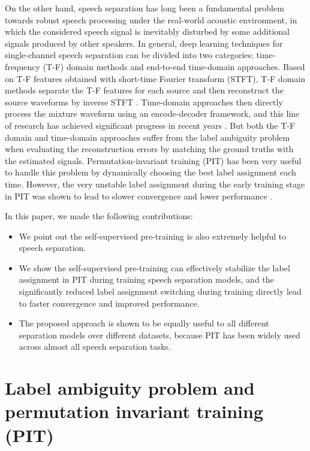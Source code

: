 \documentclass[a4paper]{article}
\begin{document}
On the other hand, speech separation has long been a fundamental problem towards robust speech processing under the real-world acoustic environment, in which the considered speech signal is inevitably disturbed by some additional signals produced by other speakers.
In general, deep learning techniques for single-channel speech separation can be divided into two categories: time-frequency (T-F) domain methods and end-to-end time-domain approaches.
Based on T-F features obtained with short-time Fourier transform (STFT), T-F domain methods separate the T-F features for each source and then reconstruct the source waveforms by inverse STFT \cite{hsu2009improvement,huang2014deep,bruna2015source,hershey2016deep,chen2017deep}.
Time-domain approaches then directly process the mixture waveform using an encode-decoder framework, and this line of research has achieved significant progress in recent years \cite{luo2019conv,luo2020dual,chen2020dual,lam2021sandglasset}.
But both the T-F domain and time-domain approaches suffer from the label ambiguity problem when evaluating the reconstruction errors by matching the ground truths with the estimated signals.
Permutation-invariant training (PIT) \cite{yu2017permutation} has been very useful to handle this problem by dynamically choosing the best label assignment each time.
However, the very unstable label assignment during the early training stage in PIT was shown to lead to slower convergence and lower performance \cite{yang2020interrupted}.

In this paper, we made the following contributions:
\begin{itemize}
\item We point out the self-supervised pre-training is also extremely helpful to speech separation.
\item We show the self-supervised pre-training can effectively stabilize the label assignment in PIT during training speech separation models, and the significantly reduced label assignment switching during training directly lead to faster convergence and improved performance.
\item The proposed approach is shown to be equally useful to all different separation models over different datasets, because PIT has been widely used across almost all speech separation tasks.
\end{itemize}


\section{Label ambiguity problem and permutation invariant training (PIT)}
\label{sec:problem}
\end{document}
